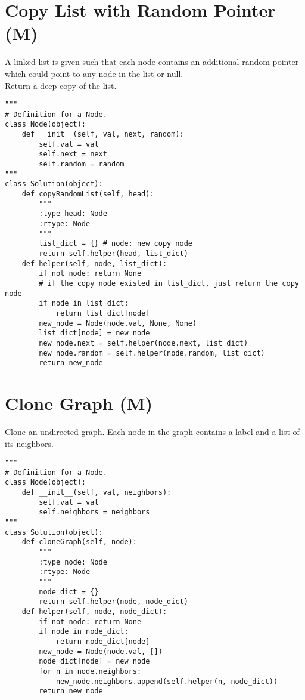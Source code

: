 \section{Copy List with Random Pointer (M)}
A linked list is given such that each node contains an additional random pointer which could point to any node in the list or null.\\

Return a deep copy of the list.\\

\begin{lstlisting}
"""
# Definition for a Node.
class Node(object):
    def __init__(self, val, next, random):
        self.val = val
        self.next = next
        self.random = random
"""
class Solution(object):
    def copyRandomList(self, head):
        """
        :type head: Node
        :rtype: Node
        """
        list_dict = {} # node: new copy node
        return self.helper(head, list_dict)
    def helper(self, node, list_dict):
        if not node: return None
        # if the copy node existed in list_dict, just return the copy node
        if node in list_dict: 
            return list_dict[node]
        new_node = Node(node.val, None, None)
        list_dict[node] = new_node
        new_node.next = self.helper(node.next, list_dict)
        new_node.random = self.helper(node.random, list_dict)
        return new_node
\end{lstlisting}


\section{Clone Graph (M)}
Clone an undirected graph. Each node in the graph contains a label and a list of its neighbors. \\

\begin{lstlisting}
"""
# Definition for a Node.
class Node(object):
    def __init__(self, val, neighbors):
        self.val = val
        self.neighbors = neighbors
"""
class Solution(object):
    def cloneGraph(self, node):
        """
        :type node: Node
        :rtype: Node
        """
        node_dict = {}
        return self.helper(node, node_dict)
    def helper(self, node, node_dict):
        if not node: return None
        if node in node_dict:
            return node_dict[node]
        new_node = Node(node.val, [])
        node_dict[node] = new_node
        for n in node.neighbors:
            new_node.neighbors.append(self.helper(n, node_dict))
        return new_node
\end{lstlisting}

